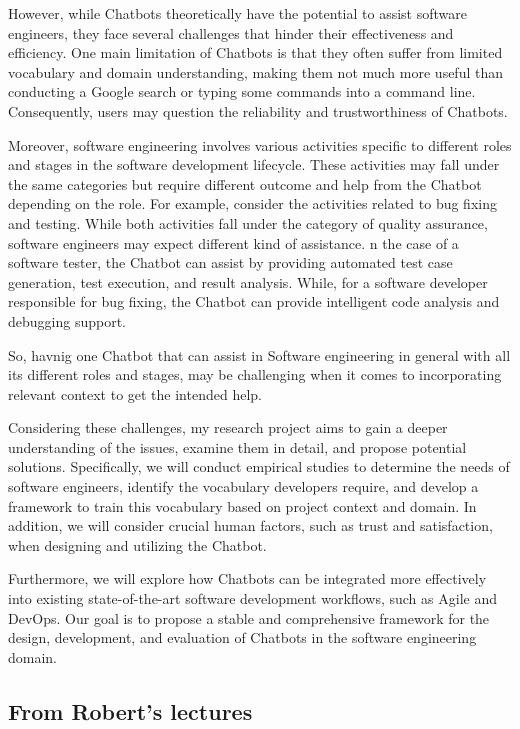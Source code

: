 \documentclass[10pt, a4paper]{article}
\begin{document}
However, while Chatbots theoretically have the potential to assist software engineers, they face several challenges that hinder their effectiveness and efficiency. One main limitation of Chatbots is that they often suffer from limited vocabulary and domain understanding, making them not much more useful than conducting a Google search or typing some commands into a command line. Consequently, users may question the reliability and trustworthiness of Chatbots.

Moreover, software engineering involves various activities specific to different roles and stages in the software development lifecycle. These activities may fall under the same categories but require different outcome and help from the Chatbot depending on the role. 
For example, consider the activities related to bug fixing and testing. While both activities fall under the category of quality assurance, software engineers may expect different kind of assistance. n the case of a software tester, the Chatbot can assist by providing automated test case generation, test execution, and result analysis. While, for a software developer responsible for bug fixing, the Chatbot can provide intelligent code analysis and debugging support.

So, havnig one Chatbot that can assist in Software engineering in general with all its different roles and stages, may be challenging when it comes to incorporating relevant context to get the intended help. 

Considering these challenges, my research project aims to gain a deeper understanding of the issues, examine them in detail, and propose potential solutions. Specifically, we will conduct empirical studies to determine the needs of software engineers, identify the vocabulary developers require, and develop a framework to train this vocabulary based on project context and domain. In addition, we will consider crucial human factors, such as trust and satisfaction, when designing and utilizing the Chatbot.

Furthermore, we will explore how Chatbots can be integrated more effectively into existing state-of-the-art software development workflows, such as Agile and DevOps. Our goal is to propose a stable and comprehensive framework for the design, development, and evaluation of Chatbots in the software engineering domain.




\subsection{From Robert's lectures}
\end{document}
